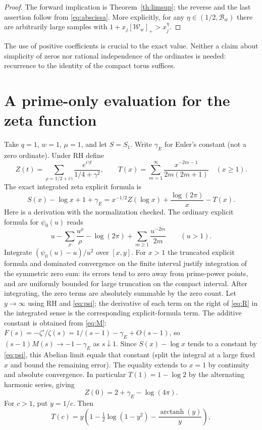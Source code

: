\documentclass[11pt]{article}
\theoremstyle{remark}\newtheorem{remark}[theorem]{Remark}
\newcommand{\B}{\mathcal B}\newcommand{\W}{\mathcal W}
\begin{document}
\begin{proof}
The forward implication is Theorem~\ref{th:limsup}; the reverse and the last assertion follow from \eqref{eq:abscissa}. More explicitly, for any $\eta\in(1/2,\B_w)$ there are arbitrarily large samples with $1+x_j[\W_w]_+>x_j^\eta$.
\end{proof}
The use of positive coefficients is crucial to the exact value. Neither a claim about simplicity of zeros nor rational independence of the ordinates is needed: recurrence to the identity of the compact torus suffices.

\section{A prime-only evaluation for the zeta function}
Take $q=1$, $w=1$, $\mu=1$, and let $S=S_1$. Write $\gamma_E$ for Euler's constant (not a zero ordinate). Under RH define
\[
 Z(t)=\sum_{\rho=1/2+i\gamma}\frac{e^{i\gamma t}}{1/4+\gamma^2},\qquad
 T(x)=\sum_{m=1}^\infty\frac{x^{-2m-1}}{2m(2m+1)}\quad(x\ge1).
\]
The exact integrated zeta explicit formula is
\begin{equation}\label{eq:R}
 S(x)-\log x+1+\gamma_E=x^{-1/2}Z(\log x)+\frac{\log(2\pi)}x-T(x).
\end{equation}
Here is a derivation with the normalization checked. The ordinary explicit formula for $\psi_0(u)$ reads
\[
 u-\sum_\rho \frac{u^\rho}{\rho}-\log(2\pi)
 +\sum_{m\ge1}\frac{u^{-2m}}{2m}\qquad(u>1).
\]
Integrate $(\psi_0(u)-u)/u^2$ over $[x,y]$. For $x>1$ the truncated explicit formula and dominated convergence on the finite interval justify integration of the symmetric zero sum: its errors tend to zero away from prime-power points, and are uniformly bounded for large truncation on the compact interval. After integrating, the zero terms are absolutely summable by the zero count. Let $y\to\infty$ using RH and \eqref{eq:psi}; the derivative of each term on the right of \eqref{eq:R} in the integrated sense is the corresponding explicit-formula term. The additive constant is obtained from \eqref{eq:M}: $F(s)=-\zeta'/\zeta(s)=1/(s-1)-\gamma_E+O(s-1)$, so $(s-1)M(s)\to-1-\gamma_E$ as $s\downarrow1$. Since $S(x)-\log x$ tends to a constant by \eqref{eq:psi}, this Abelian limit equals that constant (split the integral at a large fixed $x$ and bound the remaining error). The equality extends to $x=1$ by continuity and absolute convergence. In particular $T(1)=1-\log2$ by the alternating harmonic series, giving
\[
 Z(0)=2+\gamma_E-\log(4\pi).
\]
For $c>1$, put $y=1/c$. Then
\[
 T(c)=y\left(1-\tfrac12\log(1-y^2)-\frac{\operatorname{arctanh}(y)}y\right),
\]
\end{document}
